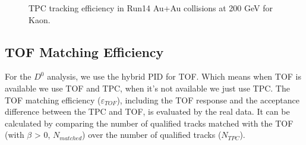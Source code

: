 \begin{figure}[htbp]
\begin{minipage}[htbp]{0.52\linewidth}
\caption{TPC tracking efficiency in Run14 Au+Au collisions at 200 GeV for Kaon. \label{fig:mkaon}}
\end{minipage}
\end{figure}

\subsection{TOF Matching Efficiency \label{sec:TOFmatch}}

For the $D^0$ analysis, we use the hybrid PID for TOF. Which means when TOF is available we use TOF and TPC, when it's not available we just use TPC. The TOF matching efficiency ($\varepsilon_{TOF}$), including the TOF response and the acceptance difference between the TPC and TOF, is evaluated by the real data. It can be calculated by comparing the number of qualified tracks matched with the TOF (with $\beta$ > 0, $N_{matched}$) over  the number of qualified tracks ($N_{TPC}$).

